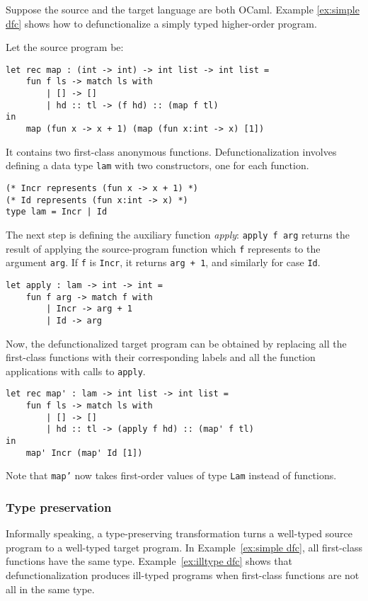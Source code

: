 Suppose the source and the target language are both OCaml. Example \ref{ex:simple dfc} shows how to defunctionalize a simply typed higher-order program.
\begin{exmp}
\label{ex:simple dfc}
Let the source program be:
\begin{lstlisting}
let rec map : (int -> int) -> int list -> int list =
    fun f ls -> match ls with
        | [] -> []
        | hd :: tl -> (f hd) :: (map f tl)
in
    map (fun x -> x + 1) (map (fun x:int -> x) [1])
\end{lstlisting}
It contains two first-class anonymous functions. Defunctionalization involves defining a data type \texttt{lam} with two constructors, one for each function.
\begin{lstlisting}
(* Incr represents (fun x -> x + 1) *)
(* Id represents (fun x:int -> x) *)
type lam = Incr | Id
\end{lstlisting}
The next step is defining the auxiliary function \textit{apply}: \texttt{apply f arg} returns the result of
applying the source-program function which \texttt{f} represents to the argument \texttt{arg}. If \texttt{f} is \texttt{Incr}, it returns \texttt{arg + 1}, and similarly for case \texttt{Id}.
\begin{lstlisting}
let apply : lam -> int -> int = 
    fun f arg -> match f with
        | Incr -> arg + 1
        | Id -> arg 
\end{lstlisting}
Now, the defunctionalized target program can be obtained by replacing all the first-class functions with their corresponding labels and all the function applications with calls to \texttt{apply}.
\begin{lstlisting}
let rec map' : lam -> int list -> int list =
    fun f ls -> match ls with
        | [] -> []
        | hd :: tl -> (apply f hd) :: (map' f tl)
in
    map' Incr (map' Id [1])
\end{lstlisting}
Note that \texttt{map'} now takes first-order values of type \texttt{Lam} instead of functions.
\end{exmp}

\subsubsection{Type preservation}
Informally speaking, a type-preserving transformation turns a well-typed source program to a well-typed target program.
In Example~\ref{ex:simple dfc}, all first-class functions have the same type. Example~\ref{ex:illtype dfc} shows that defunctionalization produces ill-typed programs when first-class functions are not all in the same type.

